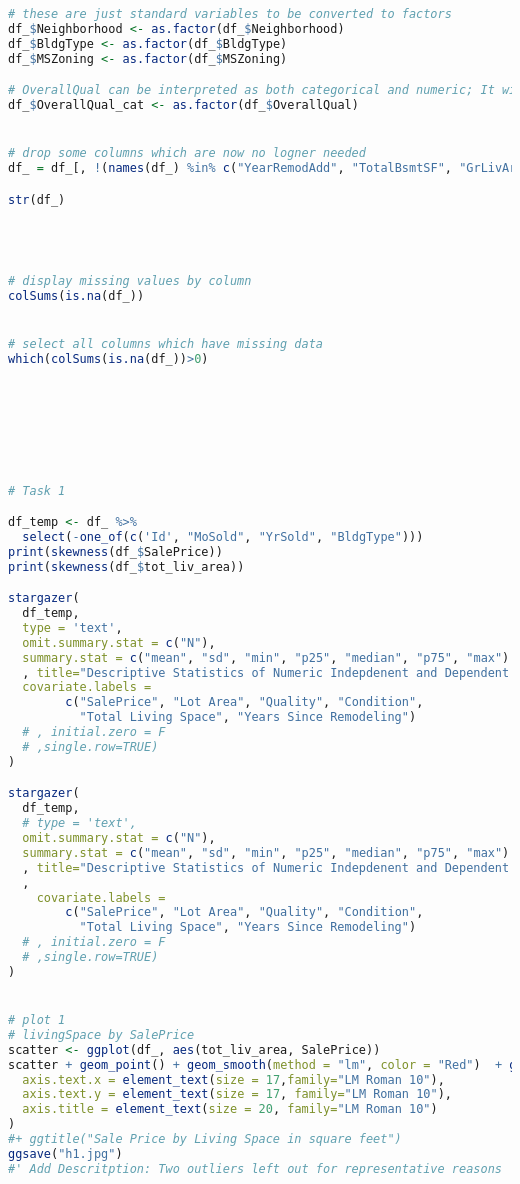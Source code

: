 \documentclass[a4paper]{article}
\begin{document}
\begin{lstlisting}[language=R]
# these are just standard variables to be converted to factors
df_$Neighborhood <- as.factor(df_$Neighborhood)
df_$BldgType <- as.factor(df_$BldgType)
df_$MSZoning <- as.factor(df_$MSZoning)

# OverallQual can be interpreted as both categorical and numeric; It wil be further elaobrated upon
df_$OverallQual_cat <- as.factor(df_$OverallQual)


# drop some columns which are now no logner needed
df_ = df_[, !(names(df_) %in% c("YearRemodAdd", "TotalBsmtSF", "GrLivArea"))]

str(df_)




# display missing values by column
colSums(is.na(df_))


# select all columns which have missing data 
which(colSums(is.na(df_))>0)







# Task 1

df_temp <- df_ %>%
  select(-one_of(c('Id', "MoSold", "YrSold", "BldgType")))
print(skewness(df_$SalePrice))
print(skewness(df_$tot_liv_area))

stargazer(
  df_temp,
  type = 'text',
  omit.summary.stat = c("N"),
  summary.stat = c("mean", "sd", "min", "p25", "median", "p75", "max")
  , title="Descriptive Statistics of Numeric Indepdenent and Dependent Varaible",
  covariate.labels = 
        c("SalePrice", "Lot Area", "Quality", "Condition",
          "Total Living Space", "Years Since Remodeling")
  # , initial.zero = F
  # ,single.row=TRUE)
)

stargazer(
  df_temp,
  # type = 'text',
  omit.summary.stat = c("N"),
  summary.stat = c("mean", "sd", "min", "p25", "median", "p75", "max")
  , title="Descriptive Statistics of Numeric Indepdenent and Dependent Varaible"
  ,
    covariate.labels = 
        c("SalePrice", "Lot Area", "Quality", "Condition",
          "Total Living Space", "Years Since Remodeling")
  # , initial.zero = F
  # ,single.row=TRUE)
)


# plot 1
# livingSpace by SalePrice
scatter <- ggplot(df_, aes(tot_liv_area, SalePrice))
scatter + geom_point() + geom_smooth(method = "lm", color = "Red")  + geom_smooth() + labs(x = 'Living space in square feet', y = "Sale Price in 1000s")+ xlim(0, 7000)  + theme(
  axis.text.x = element_text(size = 17,family="LM Roman 10"),
  axis.text.y = element_text(size = 17, family="LM Roman 10"),
  axis.title = element_text(size = 20, family="LM Roman 10")
)     
#+ ggtitle("Sale Price by Living Space in square feet")
ggsave("h1.jpg")
#' Add Descritption: Two outliers left out for representative reasons 


\end{lstlisting}
\end{document}
